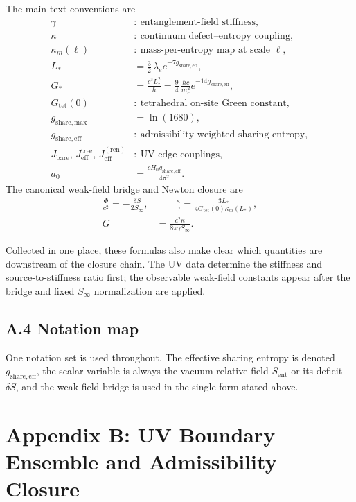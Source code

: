 \documentclass[11pt]{article}
\begin{document}
The main-text conventions are
\begin{align}
\gamma &:\ \text{entanglement-field stiffness},\\
\kappa &:\ \text{continuum defect--entropy coupling},\\
\kappa_m(\ell) &:\ \text{mass-per-entropy map at scale }\ell,\\
L_* &= \frac32\,\lambda_e e^{-7g_{\mathrm{share,eff}}},\\
G_* &= \frac{c^3L_*^2}{\hbar}
=\frac94\,\frac{\hbar c}{m_e^2}e^{-14g_{\mathrm{share,eff}}},\\
G_{\mathrm{tet}}(0) &:\ \text{tetrahedral on-site Green constant},\\
g_{\mathrm{share,max}} &= \ln(1680),\\
g_{\mathrm{share,eff}} &:\ \text{admissibility-weighted sharing entropy},\\
J_{\mathrm{bare}},\,J_{\mathrm{eff}}^{\mathrm{tree}},\,J_{\mathrm{eff}}^{(\mathrm{ren})} &:\ \text{UV edge couplings},\\
a_0 &= \frac{cH_0 g_{\mathrm{share,eff}}}{4\pi^2}.
\end{align}
The canonical weak-field bridge and Newton closure are
\[
\begin{aligned}
\frac{\Phi}{c^2}=-\frac{\delta S}{2S_\infty},
&\qquad
\frac{\kappa}{\gamma}
=
\frac{3L_*}{4G_{\mathrm{tet}}(0)\kappa_m(L_*)},\\
G&=\frac{c^2\kappa}{8\pi\gamma S_\infty}.
\end{aligned}
\]

Collected in one place, these formulas also make clear which quantities are downstream of the closure chain. The UV data determine the stiffness and source-to-stiffness ratio first; the observable weak-field constants appear after the bridge and fixed $S_\infty$ normalization are applied.

\subsection*{A.4 Notation map}

One notation set is used throughout. The effective sharing entropy is denoted $g_{\mathrm{share,eff}}$, the scalar variable is always the vacuum-relative field $S_{\mathrm{ent}}$ or its deficit $\delta S$, and the weak-field bridge is used in the single form stated above.

\section*{Appendix B: UV Boundary Ensemble and Admissibility Closure}
\end{document}
